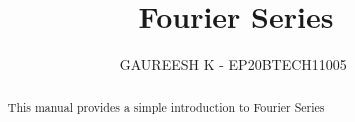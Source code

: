 \documentclass[journal,12pt,twocolumn]{IEEEtran}
\renewcommand\thesection{\arabic{section}}
\begin{document}
\let\StandardTheFigure\thefigure
\renewcommand{\thefigure}{\theproblem}



\def\putbox#1#2#3{\makebox[0in][l]{\makebox[#1][l]{}\raisebox{\baselineskip}[0in][0in]{\raisebox{#2}[0in][0in]{#3}}}}
     \def\rightbox#1{\makebox[0in][r]{#1}}
     \def\centbox#1{\makebox[0in]{#1}}
     \def\topbox#1{\raisebox{-\baselineskip}[0in][0in]{#1}}
     \def\midbox#1{\raisebox{-0.5\baselineskip}[0in][0in]{#1}}

\vspace{3cm}

\title{ 
Fourier Series
}


%
%
%

\author{ GAUREESH K - EP20BTECH11005 $^{}$}

\maketitle


\tableofcontents


\renewcommand{\thefigure}{\theenumi}
\renewcommand{\thetable}{\theenumi}



\bigskip

\begin{abstract}
This manual provides a simple introduction to Fourier Series
\end{abstract}
\end{document}
